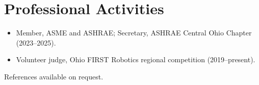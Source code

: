 \documentclass[11pt,letterpaper]{article}
\begin{document}
\section{Professional Activities}
\begin{itemize}
  \item Member, ASME and ASHRAE; Secretary, ASHRAE Central Ohio Chapter (2023--2025).
  \item Volunteer judge, Ohio FIRST Robotics regional competition (2019--present).
\end{itemize}

\vfill
\begin{center}
  \footnotesize\color{muted} References available on request.
\end{center}
\end{document}
